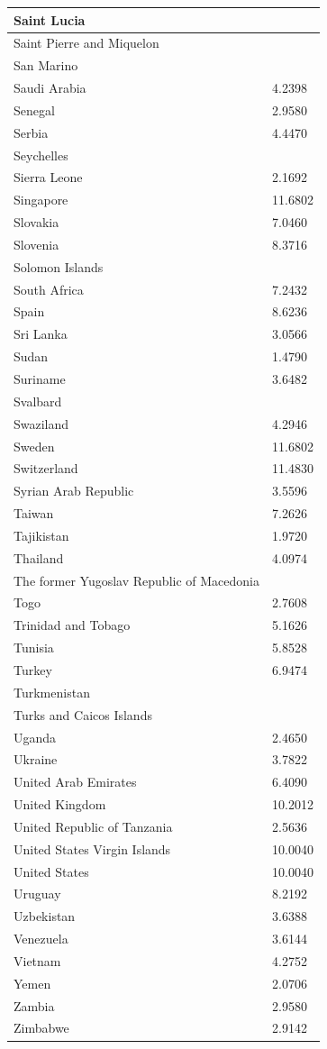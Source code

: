 \documentclass[12pt]{article}
\begin{document}
\begin{longtable}{|p{}|p{}|}
Saint Lucia& \\\hline
Saint Pierre and Miquelon& \\\hline
San Marino& \\\hline
Saudi Arabia&4.2398 \\\hline
Senegal&2.9580 \\\hline
Serbia&4.4470 \\\hline
Seychelles& \\\hline
Sierra Leone&2.1692 \\\hline
Singapore&11.6802 \\\hline
Slovakia&7.0460 \\\hline
Slovenia&8.3716 \\\hline
Solomon Islands& \\\hline
South Africa&7.2432 \\\hline
Spain&8.6236 \\\hline
Sri Lanka&3.0566 \\\hline
Sudan&1.4790 \\\hline
Suriname&3.6482 \\\hline
Svalbard& \\\hline
Swaziland&4.2946 \\\hline
Sweden&11.6802 \\\hline
Switzerland&11.4830 \\\hline
Syrian Arab Republic&3.5596 \\\hline
Taiwan&7.2626 \\\hline
Tajikistan&1.9720 \\\hline
Thailand&4.0974 \\\hline
The former Yugoslav Republic of Macedonia& \\\hline
Togo&2.7608 \\\hline
Trinidad and Tobago&5.1626 \\\hline
Tunisia&5.8528 \\\hline
Turkey&6.9474 \\\hline
Turkmenistan& \\\hline
Turks and Caicos Islands& \\\hline
Uganda&2.4650 \\\hline
Ukraine&3.7822 \\\hline
United Arab Emirates&6.4090 \\\hline
United Kingdom&10.2012 \\\hline
United Republic of Tanzania&2.5636 \\\hline
United States Virgin Islands&10.0040 \\\hline
United States&10.0040 \\\hline
Uruguay&8.2192 \\\hline
Uzbekistan&3.6388 \\\hline
Venezuela&3.6144 \\\hline
Vietnam&4.2752 \\\hline
Yemen&2.0706 \\\hline
Zambia&2.9580 \\\hline
Zimbabwe&2.9142 \\\hline
\end{longtable}
\end{document}
